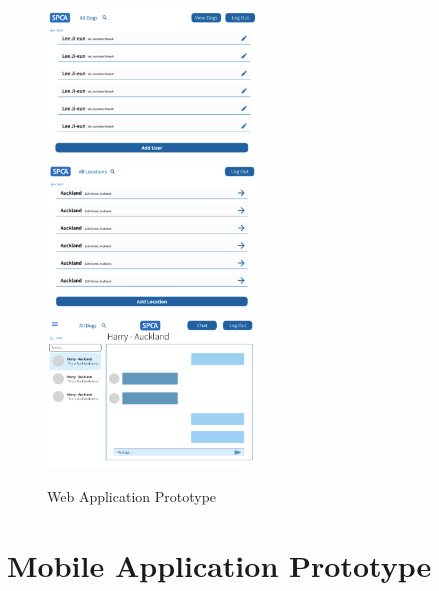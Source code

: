 \begin{figure}
    \includegraphics[width=0.5\textwidth]{images/web/web6.png} \\[\smallskipamount]
    \includegraphics[width=0.5\textwidth]{images/web/web7.png}\hfill
    \includegraphics[width=0.5\textwidth]{images/web/web8.png}
    \caption{Web Application Prototype}
    \label{fig:web}
\end{figure}



\chapter{Mobile Application Prototype}\label{appendix:mobile}


